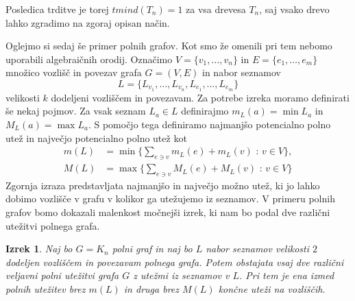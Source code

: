 \documentclass[12pt,a4paper,twoside]{article}
\theoremstyle{definition} %
\theoremstyle{plain} %
\newtheorem{izrek}[definicija]{Izrek}
\numberwithin{equation}{section}  %
\begin{document}
Posledica trditve je torej $tmind(T_n) = 1$ za vsa drevesa $T_n$, saj vsako drevo lahko zgradimo na zgoraj opisan način.

Oglejmo si sedaj še primer polnih grafov. Kot smo že omenili pri tem nebomo uporabili algebraičnih orodij. Označimo $V = \{v_1, \ldots, v_n\}$ in $E = \{e_1, \ldots, e_m\}$ množico vozlišč in povezav grafa $G=(V,E)$ in nabor seznamov
 $$L = \{L_{v_1}, \ldots, L_{v_n}, L_{e_1}, \ldots, L_{e_m}\}$$ velikosti $k$ dodeljeni vozliščem in povezavam. Za potrebe izreka moramo definirati še nekaj pojmov. Za vsak seznam $L_a \in L$ definirajmo $m_L(a) = \min L_a$ in $M_L(a) = \max L_a$. S pomočjo tega definiramo najmanjšo potencialno polno utež in največjo potencialno polno utež kot
\begin{equation*}
\begin{split}
m(L) &= \min \Big \{ \sum_{e \ni v} m_L(e) + m_L(v) \text{ : } v \in V\Big \}, \\
M(L) &= \max \Big\{ \sum_{e \ni v} M_L(e) + M_L(v) \text{ : } v \in V\Big \} 
\end{split}
\end{equation*}
Zgornja izraza predstavljata najmanjšo in največjo možno utež, ki jo lahko dobimo vozlišče v grafu v kolikor ga utežujemo iz seznamov. V primeru polnih grafov bomo dokazali malenkost  močnejši izrek, ki nam bo podal dve različni utežitvi polnega grafa.
\begin{izrek}
Naj bo $G = K_n$ polni graf in naj bo $L$ nabor seznamov velikosti $2$ dodeljen vozliščem in povezavam polnega grafa. Potem obstajata vsaj dve različni veljavni polni utežitvi grafa $G$ z utežmi iz seznamov v $L$. Pri tem je ena izmed polnih utežitev brez $m(L)$ in druga brez $M(L)$ končne uteži na vozliščih.
\end{izrek}
\end{document}
